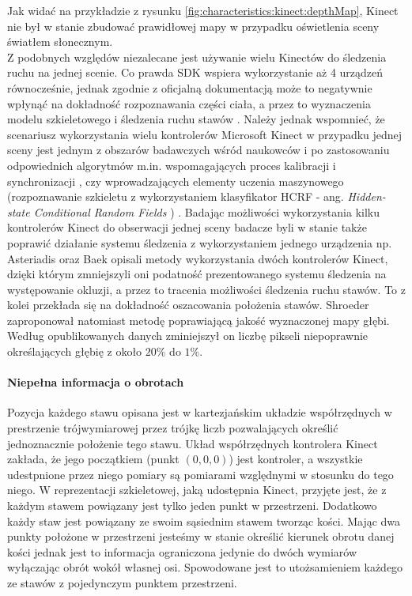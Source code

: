 	Jak widać na przykładzie z rysunku \ref{fig:characteristics:kinect:depthMap}, Kinect nie był w stanie zbudować prawidłowej mapy w przypadku oświetlenia sceny światłem słonecznym. \\
	Z podobnych względów niezalecane jest używanie wielu Kinectów do śledzenia ruchu na jednej scenie. Co prawda SDK wspiera wykorzystanie aż 4 urządzeń równocześnie, jednak zgodnie z oficjalną dokumentacją może to negatywnie wpłynąć na dokładność rozpoznawania części ciała, a przez to wyznaczenia modelu szkieletowego i śledzenia ruchu stawów \cite{msdn:multipleKinectsSDK2016}. Należy jednak wspomnieć, że scenariusz wykorzystania wielu kontrolerów Microsoft Kinect w przypadku jednej sceny jest jednym z obszarów badawczych wśród naukowców i po zastosowaniu odpowiednich algorytmów m.in.  wspomagających proces kalibracji i synchronizacji \cite{Kohno2013}, czy wprowadzających elementy uczenia maszynowego (rozpoznawanie szkieletu z wykorzystaniem klasyfikator HCRF - ang. \emph{Hidden-state Conditional Random Fields }) \cite{Kitsikidis2011}. Badając możliwości wykorzystania kilku kontrolerów Kinect do obserwacji jednej sceny badacze byli w stanie także poprawić działanie systemu śledzenia z wykorzystaniem jednego urządzenia np. Asteriadis \cite{Asteriadis2013} oraz Baek \cite{Baek2014} opisali metody wykorzystania dwóch kontrolerów Kinect, dzięki którym zmniejszyli oni podatność prezentowanego systemu śledzenia na występowanie okluzji, a przez to tracenia możliwości śledzenia ruchu stawów. To z kolei przekłada się na dokładność oszacowania położenia stawów. Shroeder \cite{Schroder2011} zaproponował natomiast metodę poprawiającą jakość wyznaczonej mapy głębi. Według opublikowanych danych zminiejszył on liczbę pikseli niepoprawnie określających głębię z około $20\%$ do $1\%$.
		
	\paragraph*{Niepełna informacja o obrotach}
	Pozycja każdego stawu opisana jest w kartezjańskim układzie współrzędnych w prestrzenie trójwymiarowej przez trójkę liczb pozwalających określić jednoznacznie położenie tego stawu. Układ współrzędnych kontrolera Kinect zakłada, że jego początkiem (punkt $(0, 0, 0)$) jest kontroler, a wszystkie udestpnione przez niego pomiary są pomiarami względnymi w stosunku do tego niego. W reprezentacji szkieletowej, jaką udostępnia Kinect, przyjęte jest, że z każdym stawem powiązany jest tylko jeden punkt w przestrzeni. Dodatkowo każdy staw jest powiązany ze swoim sąsiednim stawem tworząc kości. Mając dwa punkty położone w przestrzeni jesteśmy w stanie określić kierunek obrotu danej kości jednak jest to informacja ograniczona jedynie do dwóch wymiarów wyłączając obrót wokół własnej osi. Spowodowane jest to utożsamieniem każdego ze stawów z pojedynczym punktem przestrzeni.
		
